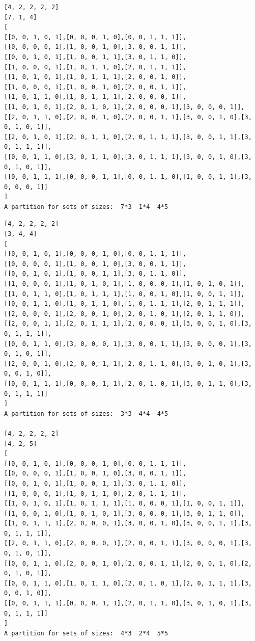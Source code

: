 \documentclass[final]{dmtcs-episciences}
\begin{document}
\begin{appendices}
\begin{verbatim}
[4, 2, 2, 2, 2]
[7, 1, 4]
[
[[0, 0, 1, 0, 1],[0, 0, 0, 1, 0],[0, 0, 1, 1, 1]],
[[0, 0, 0, 0, 1],[1, 0, 0, 1, 0],[3, 0, 0, 1, 1]],
[[0, 0, 1, 0, 1],[1, 0, 0, 1, 1],[3, 0, 1, 1, 0]],
[[1, 0, 0, 0, 1],[1, 0, 1, 1, 0],[2, 0, 1, 1, 1]],
[[1, 0, 1, 0, 1],[1, 0, 1, 1, 1],[2, 0, 0, 1, 0]],
[[1, 0, 0, 0, 1],[1, 0, 0, 1, 0],[2, 0, 0, 1, 1]],
[[1, 0, 1, 1, 0],[1, 0, 1, 1, 1],[2, 0, 0, 0, 1]],
[[1, 0, 1, 0, 1],[2, 0, 1, 0, 1],[2, 0, 0, 0, 1],[3, 0, 0, 0, 1]],
[[2, 0, 1, 1, 0],[2, 0, 0, 1, 0],[2, 0, 0, 1, 1],[3, 0, 0, 1, 0],[3, 0, 1, 0, 1]],
[[2, 0, 1, 0, 1],[2, 0, 1, 1, 0],[2, 0, 1, 1, 1],[3, 0, 0, 1, 1],[3, 0, 1, 1, 1]],
[[0, 0, 1, 1, 0],[3, 0, 1, 1, 0],[3, 0, 1, 1, 1],[3, 0, 0, 1, 0],[3, 0, 1, 0, 1]],
[[0, 0, 1, 1, 1],[0, 0, 0, 1, 1],[0, 0, 1, 1, 0],[1, 0, 0, 1, 1],[3, 0, 0, 0, 1]]
]
A partition for sets of sizes:  7*3  1*4  4*5
\end{verbatim}

\newpage

\begin{verbatim} 
[4, 2, 2, 2, 2]
[3, 4, 4]
[
[[0, 0, 1, 0, 1],[0, 0, 0, 1, 0],[0, 0, 1, 1, 1]],
[[0, 0, 0, 0, 1],[1, 0, 0, 1, 0],[3, 0, 0, 1, 1]],
[[0, 0, 1, 0, 1],[1, 0, 0, 1, 1],[3, 0, 1, 1, 0]],
[[1, 0, 0, 0, 1],[1, 0, 1, 0, 1],[1, 0, 0, 0, 1],[1, 0, 1, 0, 1]],
[[1, 0, 1, 1, 0],[1, 0, 1, 1, 1],[1, 0, 0, 1, 0],[1, 0, 0, 1, 1]],
[[0, 0, 1, 1, 0],[1, 0, 1, 1, 0],[1, 0, 1, 1, 1],[2, 0, 1, 1, 1]],
[[2, 0, 0, 0, 1],[2, 0, 0, 1, 0],[2, 0, 1, 0, 1],[2, 0, 1, 1, 0]],
[[2, 0, 0, 1, 1],[2, 0, 1, 1, 1],[2, 0, 0, 0, 1],[3, 0, 0, 1, 0],[3, 0, 1, 1, 1]],
[[0, 0, 1, 1, 0],[3, 0, 0, 0, 1],[3, 0, 0, 1, 1],[3, 0, 0, 0, 1],[3, 0, 1, 0, 1]],
[[2, 0, 0, 1, 0],[2, 0, 0, 1, 1],[2, 0, 1, 1, 0],[3, 0, 1, 0, 1],[3, 0, 0, 1, 0]],
[[0, 0, 1, 1, 1],[0, 0, 0, 1, 1],[2, 0, 1, 0, 1],[3, 0, 1, 1, 0],[3, 0, 1, 1, 1]]
]
A partition for sets of sizes:  3*3  4*4  4*5

[4, 2, 2, 2, 2]
[4, 2, 5]
[
[[0, 0, 1, 0, 1],[0, 0, 0, 1, 0],[0, 0, 1, 1, 1]],
[[0, 0, 0, 0, 1],[1, 0, 0, 1, 0],[3, 0, 0, 1, 1]],
[[0, 0, 1, 0, 1],[1, 0, 0, 1, 1],[3, 0, 1, 1, 0]],
[[1, 0, 0, 0, 1],[1, 0, 1, 1, 0],[2, 0, 1, 1, 1]],
[[1, 0, 1, 0, 1],[1, 0, 1, 1, 1],[1, 0, 0, 0, 1],[1, 0, 0, 1, 1]],
[[1, 0, 0, 1, 0],[1, 0, 1, 0, 1],[3, 0, 0, 0, 1],[3, 0, 1, 1, 0]],
[[1, 0, 1, 1, 1],[2, 0, 0, 0, 1],[3, 0, 0, 1, 0],[3, 0, 0, 1, 1],[3, 0, 1, 1, 1]],
[[2, 0, 1, 1, 0],[2, 0, 0, 0, 1],[2, 0, 0, 1, 1],[3, 0, 0, 0, 1],[3, 0, 1, 0, 1]],
[[0, 0, 1, 1, 0],[2, 0, 0, 1, 0],[2, 0, 0, 1, 1],[2, 0, 0, 1, 0],[2, 0, 1, 0, 1]],
[[0, 0, 1, 1, 0],[1, 0, 1, 1, 0],[2, 0, 1, 0, 1],[2, 0, 1, 1, 1],[3, 0, 0, 1, 0]],
[[0, 0, 1, 1, 1],[0, 0, 0, 1, 1],[2, 0, 1, 1, 0],[3, 0, 1, 0, 1],[3, 0, 1, 1, 1]]
]
A partition for sets of sizes:  4*3  2*4  5*5


\end{verbatim}
\end{appendices}
\end{document}
